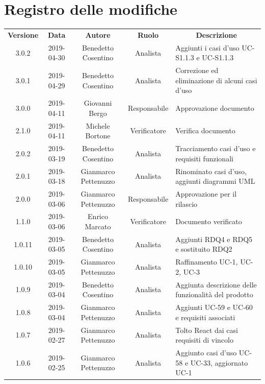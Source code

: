 \documentclass[11pt,a4paper]{article}
\begin{document}
	
	{\def\arraystretch{2}\tabcolsep=10pt
	\newpage
	\section*{\centering Registro delle modifiche}
	\begin{tabularx}{\textwidth}{ c | c | c | c | X }
		\rowcolor{LightBlue}
		\color{white}\bfseries Versione & \color{white}\bfseries Data & \color{white}\bfseries Autore & \color{white}\bfseries Ruolo & \multicolumn{1}{c}{\color{white}\bfseries Descrizione}\\[0.25cm]
		3.0.2 & 2019-04-30 & Benedetto Cosentino & Analista & Aggiunti i casi d'uso UC-S1.1.3 e UC-S1.1.3\\ \hline
		3.0.1 & 2019-04-29 & Benedetto Cosentino & Analista & Correzione ed eliminazione di alcuni casi d'uso\\ \hline
		3.0.0 & 2019-04-11 & Giovanni Bergo & Responsabile & Approvazione documento\\ \hline
		2.1.0 & 2019-04-11 & Michele Bortone & Verificatore & Verifica documento\\ \hline
		2.0.2 & 2019-03-19 & Benedetto Cosentino & Analista & Tracciamento casi d'uso e requisiti funzionali\\ \hline
		2.0.1 & 2019-03-18 & Gianmarco Pettenuzzo & Analista & Rinominato casi d'uso, aggiunti diagrammi UML\\ \hline
		2.0.0 & 2019-03-06 & Gianmarco Pettenuzzo & Responsabile & Approvazione per il rilascio\\ \hline
		1.1.0 & 2019-03-06 & Enrico Marcato & Verificatore & Documento verificato\\ \hline
		1.0.11 & 2019-03-05 & Benedetto Cosentino & Analista & Aggiunti RDQ4 e RDQ5 e sostituito RDQ2\\ \hline
		1.0.10 & 2019-03-05 & Gianmarco Pettenuzzo & Analista & Raffinamento UC-1, UC-2, UC-3 \\ \hline
		1.0.9 & 2019-03-04 & Benedetto Cosentino & Analista & Aggiunta descrizione delle funzionalità del prodotto\\ \hline
		1.0.8 & 2019-03-04 & Gianmarco Pettenuzzo & Analista & Aggiunti UC-59 e UC-60 e requisiti associati \\ \hline
		1.0.7 & 2019-02-27 & Gianmarco Pettenuzzo & Analista & Tolto React dai casi requisiti di vincolo\\ \hline
		1.0.6 & 2019-02-25 & Gianmarco Pettenuzzo & Analista & Aggiunto casi d'uso UC-58 e UC-33, aggiornato UC-1\\ \hline

\end{tabularx}}
\end{document}
